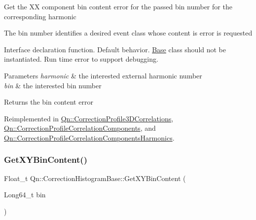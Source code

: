 Get the XX component bin content error for the passed bin number for the corresponding harmonic

The bin number identifies a desired event class whose content is error is requested

Interface declaration function. Default behavior. \mbox{\hyperlink{classBase}{Base}} class should not be instantiated. Run time error to support debugging.


\begin{DoxyParams}{Parameters}
{\em harmonic} & the interested external harmonic number \\
\hline
{\em bin} & the interested bin number \\
\hline
\end{DoxyParams}
\begin{DoxyReturn}{Returns}
the bin content error 
\end{DoxyReturn}


Reimplemented in \mbox{\hyperlink{classQn_1_1CorrectionProfile3DCorrelations_a5b8a043e3d3377b4201c87085e12dd5b}{Qn\+::\+Correction\+Profile3\+D\+Correlations}}, \mbox{\hyperlink{classQn_1_1CorrectionProfileCorrelationComponents_af27e27f474d058efe4495a90c7fa73c1}{Qn\+::\+Correction\+Profile\+Correlation\+Components}}, and \mbox{\hyperlink{classQn_1_1CorrectionProfileCorrelationComponentsHarmonics_a412fe35fd2adf2a73a6ddfdad4a3f880}{Qn\+::\+Correction\+Profile\+Correlation\+Components\+Harmonics}}.

\mbox{\label{classQn_1_1CorrectionHistogramBase_aa631b6234a81dbe46b29a95fda339b69}} 
\subsubsection{\texorpdfstring{Get\+X\+Y\+Bin\+Content()}{GetXYBinContent()}\hspace{0.1cm}{\footnotesize\ttfamily [1/2]}}
{\footnotesize\ttfamily Float\+\_\+t Qn\+::\+Correction\+Histogram\+Base\+::\+Get\+X\+Y\+Bin\+Content (\begin{DoxyParamCaption}\item[{Long64\+\_\+t}]{bin }\end{DoxyParamCaption})\hspace{0.3cm}{\ttfamily [virtual]}}

